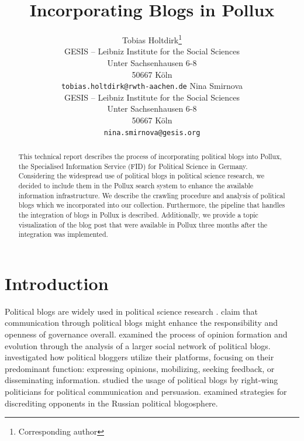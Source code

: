 \documentclass{article}
\title{Incorporating Blogs in Pollux}
\author{Tobias Holtdirk\thanks{Corresponding author}\\
    GESIS -- Leibniz Institute for the Social Sciences\\
    Unter Sachsenhausen 6-8 \\
    50667 Köln \\
    \texttt{tobias.holtdirk@rwth-aachen.de}
    \And 
    Nina Smirnova\\
    GESIS -- Leibniz Institute for the Social Sciences\\
    Unter Sachsenhausen 6-8 \\
    50667 Köln \\
    \texttt{nina.smirnova@gesis.org}
}
\begin{document}
\maketitle

\begin{abstract}
    This technical report describes the process of incorporating political blogs into Pollux, the Specialised Information Service (FID) for Political Science in Germany. Considering the widespread use of political blogs in political science research, we decided to include them in the Pollux search system to enhance the available information infrastructure. We describe the crawling procedure and analysis of political blogs which we incorporated into our collection. Furthermore, the pipeline that handles the integration of blogs in Pollux is described. Additionally, we provide a topic visualization of the blog post that were available in Pollux three months after  the integration was implemented.
\end{abstract}



\section{Introduction}
Political blogs are widely used in political science research \citep{wallsten_agenda_2007, coleman_political_2008, wallsten_political_2008, guner_political_2009, akinnubi_deliberative_2023, peng_role_2023}. \citet{coleman_political_2008} claim that communication through political blogs might enhance the responsibility and openness of governance overall. \citet{peng_role_2023} examined the process of opinion formation and evolution through the analysis of a larger social network of political blogs. \citet{wallsten_political_2008} investigated how political bloggers utilize their platforms, focusing on their predominant function: expressing opinions, mobilizing, seeking feedback, or disseminating information. \citet{demasi_analysing_2020} studied the usage of political blogs by right-wing politicians for political communication and persuasion. \citet{balakhonskaya_communicative_2020} examined strategies for discrediting opponents in the Russian political blogosphere.
\end{document}
